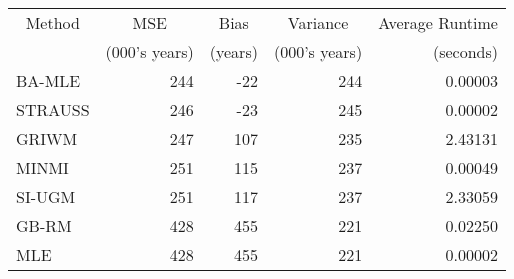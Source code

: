 
\begin{tabular}{lrrrr}
\toprule
\multicolumn{1}{c}{Method} & \multicolumn{1}{c}{MSE} & \multicolumn{1}{c}{Bias} & \multicolumn{1}{c}{Variance} & \multicolumn{1}{c}{Average Runtime} \\
\cmidrule(l{3pt}r{3pt}){1-1} \cmidrule(l{3pt}r{3pt}){2-2} \cmidrule(l{3pt}r{3pt}){3-3} \cmidrule(l{3pt}r{3pt}){4-4} \cmidrule(l{3pt}r{3pt}){5-5}
 & (000's years) & (years) & (000's years) & (seconds)\\
\midrule
BA-MLE & 244 & -22 & 244 & 0.00003\\
STRAUSS & 246 & -23 & 245 & 0.00002\\
GRIWM & 247 & 107 & 235 & 2.43131\\
MINMI & 251 & 115 & 237 & 0.00049\\
SI-UGM & 251 & 117 & 237 & 2.33059\\
\addlinespace
GB-RM & 428 & 455 & 221 & 0.02250\\
MLE & 428 & 455 & 221 & 0.00002\\
\bottomrule
\end{tabular}

